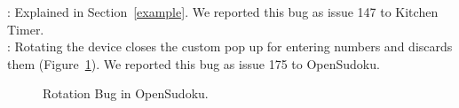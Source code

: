 : Explained in Section~\ref{example}. We reported this bug as issue 147 to Kitchen Timer.
\\
: Rotating the device closes the custom pop up for entering numbers and discards them (Figure~\ref{fig:bug25}). We reported this bug as issue 175 to OpenSudoku.
\begin{figure}[!t]
\centering
\begin{minipage}{.8\columnwidth}
\hfill
{}
\hfill
{}
\caption{Rotation Bug in OpenSudoku.}
\label{fig:bug25}
\end{minipage}
\end{figure}

